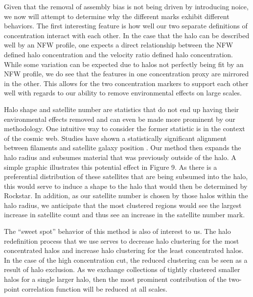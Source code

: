 \documentclass[usenatbib,usegraphicx,letterpaper]{mn2e}
\begin{document}
Given that the removal of assembly bias is not being driven by introducing noice, we now will attempt to determine why the different marks exhibit different behaviors. The first interesting feature is how well our two separate definitions of concentration interact with each other. In the case that the halo can be described well by an NFW profile, one expects a direct relationship between the NFW defined halo concentration and the velocity ratio defined halo concentration. While some variation can be expected due to halos not perfectly being fit by an NFW profile, we do see that the features in one concentration proxy are mirrored in the other. This allows for the two concentration markers to support each other well with regards to our ability to remove environmental effects on large scales.

Halo shape and satellite number are statistics that do not end up having their environmental effects removed and can even be made more prominent by our methodology. One intuitive way to consider the former statistic is in the context of the cosmic web. Studies have shown a statistically significant alignment between filaments and satellite galaxy position \citep{tempel15, velliscig15}. Our method then expands the halo radius and subsumes material that was previously outside of the halo. A simple graphic illustrates this potential effect in Figure 9. As there is a preferential distribution of these satellites that are being subsumed into the halo, this would serve to induce a shape to the halo that would then be determined by Rockstar. In addition, as our satellite number is chosen by those halos within the halo radius, we anticipate that the most clustered regions would see the largest increase in satellite count and thus see an increase in the satellite number mark.

The ``sweet spot'' behavior of this method is also of interest to us. The halo redefinition process that we use serves to decrease halo clustering for the most concentrated halos and increase halo clustering for the least concentrated halos. In the case of the high concentration cut, the reduced clustering can be seen as a result of halo exclusion. As we exchange collections of tightly clustered smaller halos for a single larger halo, then the most prominent contribution of the two-point correlation function will be reduced at all scales.
\end{document}
